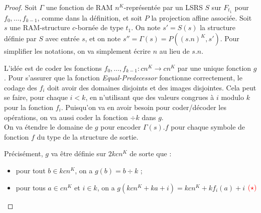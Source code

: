 \begin{appendices}
		\begin{proof}
			
			Soit $\Gamma$ une fonction de RAM $n^K$-représentée par un LSRS $S$ sur $F_{t_1}$ pour $f_0, \dots, f_{k-1}$, comme dans la définition, et soit $P$ la projection affine associée. Soit $s$ une RAM-structure $c$-bornée de type $t_1$. On note $s' = S(s)$ la structure définie par $S$ avec entrée $s$, et on note $s'' = \Gamma(s) = P\left( (s.n)^K, s'\right)$. Pour simplifier les notations, on va simplement écrire $n$ au lieu de $s.n$.
			
			L'idée est de coder les fonctions $f_0, \dots, f_{k-1} : cn^K \to cn^K$ par une unique fonction $g$. Pour s'assurer que la fonction \emph{Equal-Predecessor} fonctionne correctement, le codage des $f_i$ doit avoir des domaines disjoints et des images disjointes. Cela peut se faire, pour chaque $i<k$, en n'utilisant que des valeurs congrues à $i$ modulo $k$ pour la fonction $f_i$. Puisqu'on va en avoir besoin pour coder/décoder les opérations, on va aussi coder la fonction $\div k$ dans $g$.\\
			
			On va étendre le domaine de $g$ pour encoder $\Gamma(s).f$ pour chaque symbole de fonction $f$ du type de la structure de sortie.
			
			Précisément, $g$ va être définie sur $2kcn^K$ de sorte que :
			
			\begin{itemize}[itemsep=-1mm]
				\item	pour tout $b \in kcn^K$, on a $g(b) = b \div k$ ;
				\item 	pour tous $a \in cn^K$ et $i \in k$, on a $g\left( kcn^K + ka + i \right) = kcn^K + k f_i(a) + i$ $\textcolor{red}{(\star)}$
			\end{itemize}
			
			\espace
			

\end{proof}
\end{appendices}
